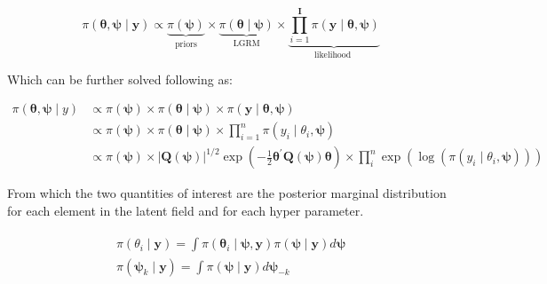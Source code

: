 \documentclass[
  12pt,
  a4paper,
  oneside]{book}
\theoremstyle{definition}
\theoremstyle{definition}
\theoremstyle{definition}
\theoremstyle{remark}
\begin{document}
\begin{equation}
\pi(\boldsymbol{\theta}, \boldsymbol{\psi} \mid \mathbf{y})\propto  \underbrace{\pi(\boldsymbol{\psi})}_{\text {priors}} \times \underbrace{\pi(\boldsymbol\theta \mid \boldsymbol\psi)}_{\text {LGRM}} \times \underbrace{\prod_{i=1}^{\mathbf{I}} \pi\left(\mathbf{y} \mid \boldsymbol\theta, \boldsymbol{\psi}\right)}_{\text {likelihood }}
\label{eq:formallgm}
\end{equation}

Which can be further solved following \citep{Blangiardo-Cameletti} as:

\begin{equation}
\begin{aligned}
\pi(\boldsymbol{\theta}, \boldsymbol{\psi} \mid y) & \propto \pi(\boldsymbol{\psi}) \times \pi(\boldsymbol{\theta} \mid \boldsymbol{\psi}) \times \pi(\mathbf{y} \mid \boldsymbol{\theta}, \boldsymbol{\psi}) \\
& \propto \pi(\boldsymbol{\psi}) \times \pi(\boldsymbol{\theta} \mid \boldsymbol{\psi}) \times \prod_{i=1}^{n} \pi\left(y_{i} \mid \theta_{i}, \boldsymbol{\psi}\right) \\
& \propto \pi(\boldsymbol{\psi}) \times|\boldsymbol{Q}(\boldsymbol{\psi})|^{1 / 2} \exp \left(-\frac{1}{2} \boldsymbol{\theta}^{\prime} \boldsymbol{Q}(\boldsymbol{\psi}) \boldsymbol{\theta}\right) \times \prod_{i}^{n} \exp \left(\log \left(\pi\left(y_{i} \mid \theta_{i}, \boldsymbol{\psi}\right)\right)\right)
\end{aligned}
\label{eq:finallgm}
\end{equation}

From which the two quantities of interest are the posterior marginal distribution for each element in the latent field and for each hyper parameter.

\begin{equation}
\begin{aligned}
\begin{array}{l}
\pi\left(\theta_{i} \mid \boldsymbol{\mathbf{y}}\right)=\int \pi\left(\boldsymbol{\theta}_{i} \mid \boldsymbol{\psi}, \boldsymbol{\mathbf{y}}\right) \pi(\boldsymbol{\psi} \mid \boldsymbol{\mathbf{y}}) d \boldsymbol{\psi} \\
\pi\left(\boldsymbol{\psi}_{k} \mid \boldsymbol{\mathbf{y}}\right)=\int \pi(\boldsymbol{\psi} \mid \boldsymbol{\mathbf{y}}) d \boldsymbol{\psi}_{-k}
\end{array}
\end{aligned}
\label{eq:finalobj}
\end{equation}
\end{document}
